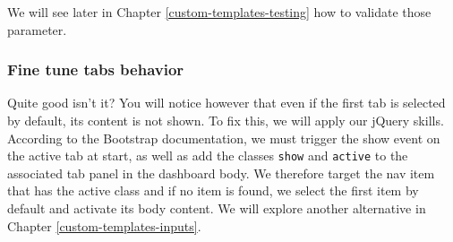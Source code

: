\documentclass[
]{book}
\newenvironment{Shaded}{\begin{snugshade}}{\end{snugshade}}
\newcommand{\AttributeTok}[1]{\textcolor[rgb]{0.77,0.63,0.00}{#1}}
\newcommand{\CommentTok}[1]{\textcolor[rgb]{0.56,0.35,0.01}{\textit{#1}}}
\newcommand{\ControlFlowTok}[1]{\textcolor[rgb]{0.13,0.29,0.53}{\textbf{#1}}}
\newcommand{\DecValTok}[1]{\textcolor[rgb]{0.00,0.00,0.81}{#1}}
\newcommand{\KeywordTok}[1]{\textcolor[rgb]{0.13,0.29,0.53}{\textbf{#1}}}
\newcommand{\NormalTok}[1]{#1}
\newcommand{\OperatorTok}[1]{\textcolor[rgb]{0.81,0.36,0.00}{\textbf{#1}}}
\newcommand{\SpecialCharTok}[1]{\textcolor[rgb]{0.00,0.00,0.00}{#1}}
\newcommand{\StringTok}[1]{\textcolor[rgb]{0.31,0.60,0.02}{#1}}
\newcommand{\VariableTok}[1]{\textcolor[rgb]{0.00,0.00,0.00}{#1}}
\newcommand{\VerbatimStringTok}[1]{\textcolor[rgb]{0.31,0.60,0.02}{#1}}
\begin{document}
We will see later in Chapter \ref{custom-templates-testing} how to validate those parameter.

\hypertarget{fine-tune-tabs-behavior}{%
\subsubsection{Fine tune tabs behavior}\label{fine-tune-tabs-behavior}}

Quite good isn't it? You will notice however that even if the first tab is selected by default, its content is not shown. To fix this, we will apply our jQuery skills. According to the Bootstrap documentation, we must trigger the show event on the active tab at start, as well as add the classes \texttt{show} and \texttt{active} to the associated tab panel in the dashboard body. We therefore target the nav item that has the active class and if no item is found, we select the first item by default and activate its body content. We will explore another alternative in Chapter \ref{custom-templates-inputs}.

\begin{Shaded}
\end{Shaded}
\end{document}
